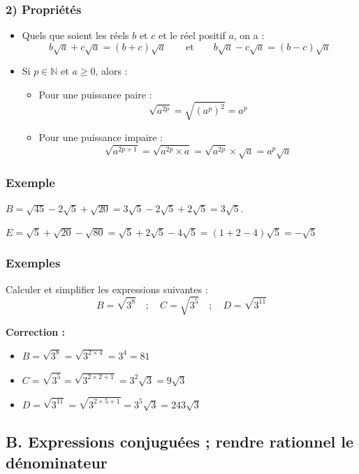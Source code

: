 \documentclass[12pt,a4paper]{article}
\begin{document}
\subsubsection*{\color{myred} 2) Propriétés}
\begin{itemize}
    \item Quels que soient les réels $b$ et $c$ et le réel positif $a$, on a :
    \[
    b\sqrt{a} + c\sqrt{a} = (b+c)\sqrt{a} \qquad \text{et} \qquad b\sqrt{a} - c\sqrt{a} = (b-c)\sqrt{a}
    \]
\item Si $p \in \mathbb{N}$ et $a \ge 0$, alors :
\begin{itemize}
    \item Pour une puissance paire :
    \[
    \sqrt{a^{2p}} = \sqrt{(a^p)^2} = a^p
    \]
    \item Pour une puissance impaire :
    \[
    \sqrt{a^{2p+1}} = \sqrt{a^{2p} \times a} = \sqrt{a^{2p}} \times \sqrt{a} = a^p\sqrt{a}
    \]
\end{itemize}
\end{itemize}
\subsubsection*{\color{myred} Exemple}
$B = \sqrt{45} - 2\sqrt{5} + \sqrt{20} = 3\sqrt{5} - 2\sqrt{5} + 2\sqrt{5} = 3\sqrt{5}$.

$
E = \sqrt{5} + \sqrt{20} - \sqrt{80} = \sqrt{5} + 2\sqrt{5} - 4\sqrt{5} = (1 + 2 - 4)\sqrt{5} = -\sqrt{5}
$
\subsubsection*{\color{myred} Exemples}
Calculer et simplifier les expressions suivantes :
\[
B = \sqrt{3^{8}} \quad ; \quad C = \sqrt{3^{5}} \quad ; \quad D = \sqrt{3^{11}}
\]

\noindent \textbf{Correction :}
\begin{itemize}
    \item $B = \sqrt{3^{8}} = \sqrt{3^{2 \times 4}} = 3^4 = 81$
    \item $C = \sqrt{3^{5}} = \sqrt{3^{2 \times 2 + 1}} = 3^2\sqrt{3} = 9\sqrt{3}$
    \item $D = \sqrt{3^{11}} = \sqrt{3^{2 \times 5 + 1}} = 3^5\sqrt{3} = 243\sqrt{3}$
\end{itemize}
\subsection*{B. Expressions conjuguées ; rendre rationnel le dénominateur}
\end{document}
